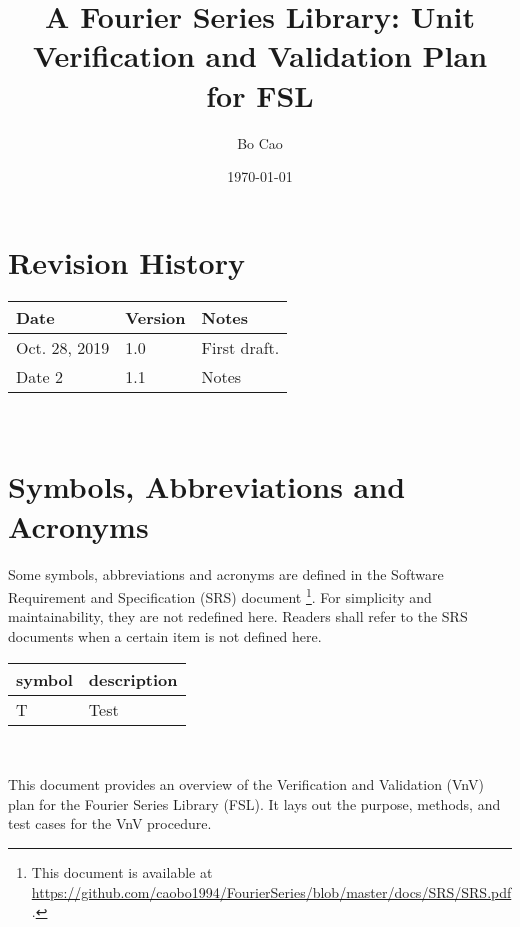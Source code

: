 \documentclass[12pt, titlepage]{article}
\begin{document}
\title{A Fourier Series Library: Unit Verification and Validation Plan for FSL} 
\author{Bo Cao}
\date{\today}
	
\maketitle


\section{Revision History}

\begin{tabularx}{\textwidth}{p{3cm}p{2cm}X}
\toprule {\bf Date} & {\bf Version} & {\bf Notes}\\
\midrule
Oct. 28, 2019  & 1.0 & First draft.\\
Date 2 & 1.1 & Notes\\
\bottomrule
\end{tabularx}

~\newpage

\tableofcontents

\newpage

\section{Symbols, Abbreviations and Acronyms}

Some symbols, abbreviations and acronyms are defined in the Software Requirement and Specification (SRS) document \footnote{This document is available at \url{https://github.com/caobo1994/FourierSeries/blob/master/docs/SRS/SRS.pdf}.}. For simplicity and maintainability, they are not redefined here. Readers shall refer to the SRS documents when a certain item is not defined here.

\renewcommand{\arraystretch}{1.2}
\begin{tabular}{l l} 
  \toprule		
  \textbf{symbol} & \textbf{description}\\
  \midrule 
  T & Test\\
  \bottomrule
\end{tabular}\\


\newpage


This document provides an overview of the Verification and Validation (VnV) plan for the Fourier Series Library (FSL). It lays out the purpose, methods, and test cases for the VnV procedure. 
\end{document}
